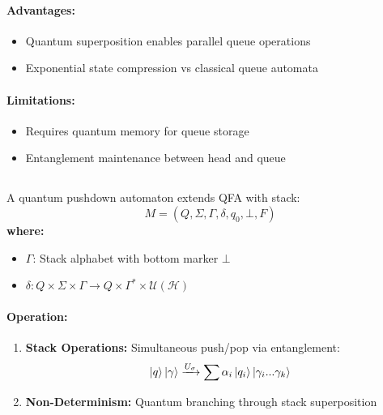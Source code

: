 \paragraph{Advantages:}
\begin{itemize}
    \item Quantum superposition enables parallel queue operations
    \item Exponential state compression vs classical queue automata
\end{itemize}

\paragraph{Limitations:}
\begin{itemize}
    \item Requires quantum memory for queue storage
    \item Entanglement maintenance between head and queue
\end{itemize}

\subsection{}
\label{subsec:qpa}

\begin{definition}
A quantum pushdown automaton extends QFA with stack:
\[
M = (Q, \Sigma, \Gamma, \delta, q_0, \bot, F)
\]
\textbf{where:}
\begin{itemize}
    \item $\Gamma$: Stack alphabet with bottom marker $\bot$
    \item $\delta: Q \times \Sigma \times \Gamma \rightarrow Q \times \Gamma^* \times \mathcal{U}(\mathcal{H})$
\end{itemize}
\end{definition}

\paragraph{Operation:}
\begin{enumerate}
    \item \textbf{Stack Operations:} Simultaneous push/pop via entanglement:
    \[
    \ket{q}\ket{\gamma} \xrightarrow{U_\sigma} \sum \alpha_i \ket{q_i}\ket{\gamma_i...\gamma_k}
    \]
    \item \textbf{Non-Determinism:} Quantum branching through stack superposition
\end{enumerate}

